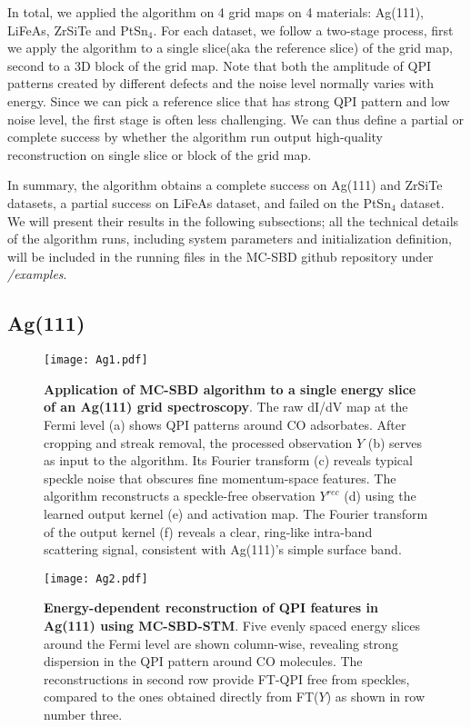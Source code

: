 In total, we applied the algorithm on 4 grid maps on 4 materials: Ag(111), LiFeAs, ZrSiTe and PtSn$_4$. For each dataset, we follow a two-stage process, first we apply the algorithm to a single slice(aka the reference slice) of the grid map, second to a 3D block of the grid map. Note that both the amplitude of QPI patterns created by different defects and the noise level normally varies with energy. Since we can pick a reference slice that has strong QPI pattern and low noise level, the first stage is often less challenging. We can thus define a partial or complete success by whether the algorithm run output high-quality reconstruction on single slice or block of the grid map. 

In summary, the algorithm obtains a complete success on Ag(111) and ZrSiTe datasets, a partial success on LiFeAs dataset, and failed on the PtSn$_4$ dataset.  We will present their results in the following subsections; all the technical details of the algorithm runs, including system parameters and initialization definition, will be included in the running files in the MC-SBD github repository under \textit{\slash examples}. 

\subsection{Ag(111)}

\begin{figure}
	\texttt{[image: Ag1.pdf]} 
	\centering
	\caption[\textbf{Application of MC-SBD algorithm to a single energy slice of an Ag(111) grid spectroscopy}]{\textbf{Application of MC-SBD algorithm to a single energy slice of an Ag(111) grid spectroscopy}. The raw dI/dV map at the Fermi level (a) shows QPI patterns around CO adsorbates. After cropping and streak removal, the processed observation $Y$ (b) serves as input to the algorithm. Its Fourier transform (c) reveals typical speckle noise that obscures fine momentum-space features. The algorithm reconstructs a speckle-free observation $Y^{rec}$ (d) using the learned output kernel (e) and activation map. The Fourier transform of the output kernel (f) reveals a clear, ring-like intra-band scattering signal, consistent with Ag(111)’s simple surface band. }
	\label{fig:Ag1}
\end{figure}

\begin{figure}
	\texttt{[image: Ag2.pdf]} 
	\centering
	\caption{\textbf{Energy-dependent reconstruction of QPI features in Ag(111) using MC-SBD-STM}. Five evenly spaced energy slices around the Fermi level are shown column-wise, revealing strong dispersion in the QPI pattern around CO molecules. The reconstructions in second row provide FT-QPI free from speckles, compared to the ones obtained directly from FT($Y$) as shown in row number three.}
	\label{fig:Ag2}
\end{figure}

